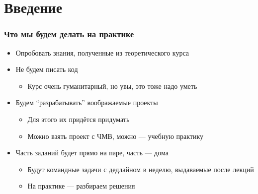 \documentclass{../../slides-style}
\begin{document}
    \begin{frame}[plain]
        \titlepage
    \end{frame}

    \section{Введение}

    \begin{frame}
        \frametitle{Что мы будем делать на практике}
        \begin{itemize}
            \item Опробовать знания, полученные из теоретического курса
            \item Не будем писать код
            \begin{itemize}
                \item Курс очень гуманитарный, но увы, это тоже надо уметь
            \end{itemize}
            \item Будем \enquote{разрабатывать} воображаемые проекты
            \begin{itemize}
                \item Для этого их придётся придумать
                \item Можно взять проект с ЧМВ, можно --- учебную практику
            \end{itemize}
            \item Часть заданий будет прямо на паре, часть --- дома
            \begin{itemize}
                \item Будут командные задачи с дедлайном в неделю, выдаваемые после лекций
                \item На практике --- разбираем решения
            \end{itemize}
        \end{itemize}
    \end{frame}
\end{document}
